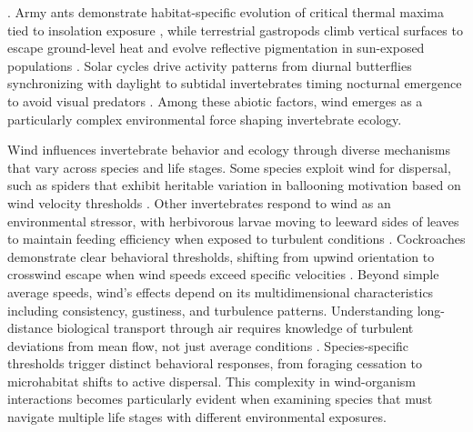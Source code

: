 \citep{gosselinEffectsSolarRadiation2010,chapperonExposureSolarRadiation2016}. Army ants demonstrate habitat-specific evolution of critical thermal maxima tied to insolation exposure \citep{baudierExtremeInsolationClimatic2018}, while terrestrial gastropods climb vertical surfaces to escape ground-level heat and evolve reflective pigmentation in sun-exposed populations \citep{schweizerSnailsSunStrategies2019}. Solar cycles drive activity patterns from diurnal butterflies synchronizing with daylight to subtidal invertebrates timing nocturnal emergence to avoid visual predators \citep{saigusaDailyRhythmsEmergence2001}. Among these abiotic factors, wind emerges as a particularly complex environmental force shaping invertebrate ecology.

Wind influences invertebrate behavior and ecology through diverse mechanisms that vary across species and life stages. Some species exploit wind for dispersal, such as spiders that exhibit heritable variation in ballooning motivation based on wind velocity thresholds \citep{bonteHeritabilitySpiderBallooning2007}. Other invertebrates respond to wind as an environmental stressor, with herbivorous larvae moving to leeward sides of leaves to maintain feeding efficiency when exposed to turbulent conditions \citep{leonardExposureWindAlters2016}. Cockroaches demonstrate clear behavioral thresholds, shifting from upwind orientation to crosswind escape when wind speeds exceed specific velocities \citep{bellSearchAnemotacticOrientation1979}. Beyond simple average speeds, wind's effects depend on its multidimensional characteristics including consistency, gustiness, and turbulence patterns. Understanding long-distance biological transport through air requires knowledge of turbulent deviations from mean flow, not just average conditions \citep{nathanLongdistanceBiologicalTransport2005}. Species-specific thresholds trigger distinct behavioral responses, from foraging cessation to microhabitat shifts to active dispersal. This complexity in wind-organism interactions becomes particularly evident when examining species that must navigate multiple life stages with different environmental exposures.

